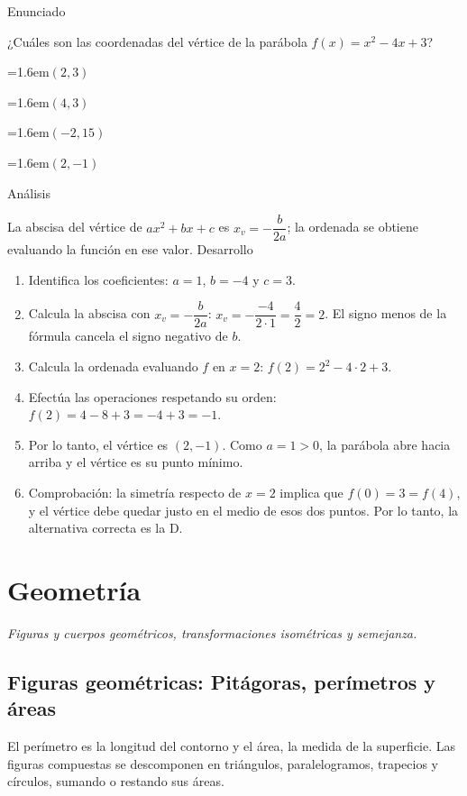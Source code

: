 \documentclass[10pt,a4paper,twocolumn]{article}
\newcommand{\alternativa}[2]{\par\noindent\hangindent=1.6em\hangafter=1\makebox[1.6em][l]{\tecla{#1}}#2\par}
\newcommand{\clave}[1]{\par\smallskip{\sffamily\footnotesize\color{esmeralda} Clave \teclaok{#1}}\par}
\begin{document}
\begin{ejemplo}
{\sffamily\footnotesize\color{zinc500} Enunciado}\par
¿Cuáles son las coordenadas del vértice de la parábola $f(x) = x^2 - 4x + 3$?
\alternativa{A}{$(2, 3)$}
\alternativa{B}{$(4, 3)$}
\alternativa{C}{$(-2, 15)$}
\alternativa{D}{$(2, -1)$}
\clave{D}
{\sffamily\footnotesize\color{zinc500} Análisis}\par La abscisa del vértice de $ax^2 + bx + c$ es $x_v = -\dfrac{b}{2a}$; la ordenada se obtiene evaluando la función en ese valor.
{\sffamily\footnotesize\color{zinc500} Desarrollo}
\begin{enumerate}
  \item Identifica los coeficientes: $a = 1$, $b = -4$ y $c = 3$.
  \item Calcula la abscisa con $x_v = -\dfrac{b}{2a}$: $x_v = -\dfrac{-4}{2\cdot 1} = \dfrac{4}{2} = 2$. El signo menos de la fórmula cancela el signo negativo de $b$.
  \item Calcula la ordenada evaluando $f$ en $x = 2$: $f(2) = 2^2 - 4\cdot 2 + 3$.
  \item Efectúa las operaciones respetando su orden: $f(2) = 4 - 8 + 3 = -4 + 3 = -1$.
  \item Por lo tanto, el vértice es $(2, -1)$. Como $a = 1 > 0$, la parábola abre hacia arriba y el vértice es su punto mínimo.
  \item Comprobación: la simetría respecto de $x = 2$ implica que $f(0) = 3 = f(4)$, y el vértice debe quedar justo en el medio de esos dos puntos. Por lo tanto, la alternativa correcta es la D.
\end{enumerate}
\end{ejemplo}

\section{Geometría}

{\itshape\color{zinc700} Figuras y cuerpos geométricos, transformaciones isométricas y semejanza.}

\subsection{Figuras geométricas: Pitágoras, perímetros y áreas}

El perímetro es la longitud del contorno y el área, la medida de la superficie. Las figuras compuestas se descomponen en triángulos, paralelogramos, trapecios y círculos, sumando o restando sus áreas.
\end{document}
